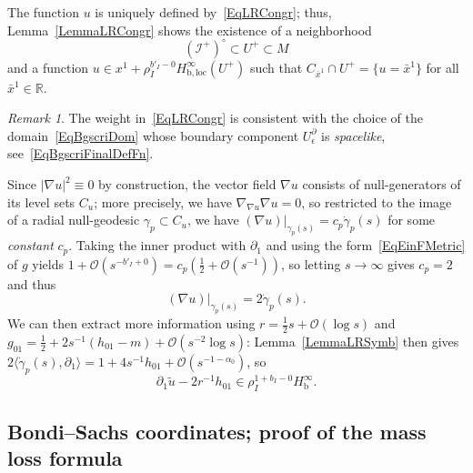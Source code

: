 \documentclass[reqno,11pt,letterpaper]{amsart}
\numberwithin{equation}{section}
\numberwithin{figure}{section}
\theoremstyle{definition}
\theoremstyle{remark}
\newtheorem{rmk}[thm]{Remark}
\newcommand{\mc}{\mathcal}
\newcommand{\cO}{\mc O}
\newcommand{\ms}{\mathscr}
\newcommand{\scri}{\ms I}
\newcommand{\R}{\mathbb{R}}
\newcommand{\eps}{\epsilon}
\newcommand{\la}{\langle}
\newcommand{\pa}{\partial}
\newcommand{\ra}{\rangle}
\newcommand{\wt}{\widetilde}
\newcommand{\bop}{{\mathrm{b}}}
\newcommand{\half}{\tfrac{1}{2}}
\newcommand{\loc}{{\mathrm{loc}}}
\newcommand{\Hb}{H_{\bop}}
\newcommand{\Hbloc}{H_{\bop,\loc}}
\begin{document}
The function $u$ is uniquely defined by~\eqref{EqLRCongr}; thus, Lemma~\ref{LemmaLRCongr} shows the existence of a neighborhood
\begin{equation}
\label{EqLRNbh}
  (\scri^+)^\circ\subset U^+\subset M
\end{equation}
and a function $u\in x^1+\rho_I^{b'_I-0}\Hbloc^\infty(U^+)$ such that $C_{\bar x^1}\cap U^+=\{u=\bar x^1\}$ for all $\bar x^1\in\R$.

\begin{rmk}
  The weight in~\eqref{EqLRCongr} is consistent with the choice of the domain~\eqref{EqBgscriDom} whose boundary component $U_\eps^\pa$ is \emph{spacelike}, see~\eqref{EqBgscriFinalDefFn}.
\end{rmk}

Since $|\nabla u|^2\equiv 0$ by construction, the vector field $\nabla u$ consists of null-generators of its level sets $C_u$; more precisely, we have $\nabla_{\nabla u}\nabla u=0$, so restricted to the image of a radial null-geodesic $\gamma_p\subset C_u$, we have $(\nabla u)|_{\gamma_p(s)}=c_p\dot\gamma_p(s)$ for some \emph{constant} $c_p$. Taking the inner product with $\pa_1$ and using the form~\eqref{EqEinFMetric} of $g$ yields $1+\cO(s^{-b'_I+0})=c_p(\half+\cO(s^{-1}))$, so letting $s\to\infty$ gives $c_p=2$ and thus
\[
  (\nabla u)|_{\gamma_p(s)} = 2\dot\gamma_p(s).
\]
We can then extract more information using $r=\half s+\cO(\log s)$ and $g_{0 1}=\half+2 s^{-1}(h_{0 1}-m)+\cO(s^{-2}\log s)$: Lemma~\ref{LemmaLRSymb} then gives $2\la\dot\gamma_p(s),\pa_1\ra=1+4 s^{-1}h_{0 1}+\cO(s^{-1-\alpha_0})$, so
\begin{equation}
\label{EqLRuDer}
  \pa_1\wt u-2 r^{-1}h_{0 1}\in\rho_I^{1+b_I-0}\Hb^\infty.
\end{equation}


\subsection{Bondi--Sachs coordinates; proof of the mass loss formula}
\label{SsLBS}
\end{document}
